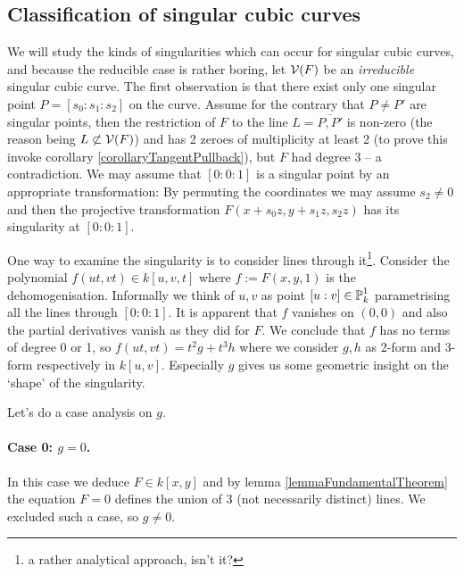 \subsection{Classification of singular cubic curves}

We will study the kinds of singularities which can occur for singular cubic curves, and because the reducible case is rather boring,
let $\operatorname{\mathcal V}(F)$ be an \emph{irreducible} singular cubic curve.
The first observation is that there exist only one singular point $P = [s_0:s_1:s_2]$ on the curve.
Assume for the contrary that $P \neq P'$ are singular points, then the restriction of $F$ to the line $L = \overline{P,P'}$ is non-zero (the reason being $L \not\subset \operatorname{\mathcal V}(F)$) and has 2 zeroes of multiplicity at least 2 (to prove this invoke corollary \ref{corollaryTangentPullback}), but $F$ had degree 3 -- a contradiction.
We may assume that $[0:0:1]$ is a singular point by an appropriate transformation:
By permuting the coordinates we may assume $s_2 \neq 0$ and then the projective transformation $F(x+s_0z,y+s_1z,s_2z)$ has its singularity at $[0:0:1]$.

One way to examine the singularity is to consider lines through it\footnote{a rather analytical approach, isn't it?}.
Consider the polynomial $f(ut, vt) \in k[u,v,t]$ where $f := F(x,y,1)$ is the dehomogenisation.
Informally we think of $u,v$ as point $[u:v] \in \operatorname{\mathbb P}^1_k$ parametrising all the lines through $[0:0:1]$.
It is apparent that $f$ vanishes on $(0,0)$ and also the partial derivatives vanish as they did for $F$.
We conclude that $f$ has no terms of degree 0 or 1, so $f(ut,vt) = t^2g + t^3h$ where we consider $g,h$ as 2-form and 3-form respectively in $k[u,v]$.
Especially $g$ gives us some geometric insight on the `shape' of the singularity.

Let's do a case analysis on $g$.
\paragraph{Case 0: $g=0$.}
In this case we deduce $F \in k[x,y]$ and by lemma \ref{lemmaFundamentalTheorem} the equation $F=0$ defines the union of 3 (not necessarily distinct) lines.
We excluded such a case, so $g \neq 0$.

